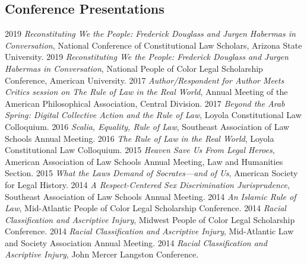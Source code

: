 \documentclass[letterpaper]{moderncv}
\begin{document}
\subsection{Conference Presentations}
\cvitem
{2019}
{\textit{Reconstituting We the People: Frederick Douglass and Jurgen Habermas in Conversation}, National Conference of Constitutional Law Scholars, Arizona State University.}
\vspace{1mm}
\cvitem
{2019}
{\textit{Reconstituting We the People: Frederick Douglass and Jurgen Habermas in Conversation}, National People of Color Legal Scholarship Conference, American University.}
\vspace{1mm}
\cvitem
{2017}
{\textit{Author/Respondent for Author Meets Critics session on The Rule of Law in the Real World}, Annual Meeting of the American Philosophical Association, Central Division.}
\vspace{1mm}
\cvitem
{2017}
{\textit{Beyond the Arab Spring: Digital Collective Action and the Rule of Law}, Loyola Constitutional Law Colloquium.}
\vspace{1mm}
\cvitem
{2016}
{\textit{Scalia, Equality, Rule of Law}, Southeast Association of Law Schools Annual Meeting.}
\vspace{1mm}
\cvitem
{2016}
{\textit{The Rule of Law in the Real World}, Loyola Constitutional Law Colloquium.}
\vspace{1mm}
\cvitem
{2015}
{\textit{Heaven Save Us From Legal Heroes}, American Association of Law Schools Annual Meeting, Law and Humanities Section.}
\vspace{1mm}
\cvitem
{2015}
{\textit{What the Laws Demand of Socrates---and of Us}, American Society for Legal History.}
\vspace{1mm}
\cvitem
{2014}
{\textit{A Respect-Centered Sex Discrimination Jurisprudence}, Southeast Association of Law Schools Annual Meeting.}
\vspace{1mm}
\cvitem
{2014}
{\textit{An Islamic Rule of Law}, Mid-Atlantic People of Color Legal Scholarship Conference.}
\vspace{1mm}
\cvitem
{2014}
{\textit{Racial Classification and Ascriptive Injury}, Midwest People of Color Legal Scholarship Conference.}
\vspace{1mm}
\cvitem
{2014}
{\textit{Racial Classification and Ascriptive Injury}, Mid-Atlantic Law and Society Association Annual Meeting.}
\vspace{1mm}
\cvitem
{2014}
{\textit{Racial Classification and Ascriptive Injury}, John Mercer Langston Conference.}
\vspace{1mm}
\end{document}
